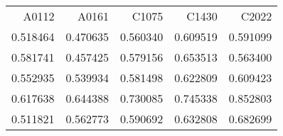 \begin{tabular}{rrrrr}
\toprule
   A0112 &    A0161 &    C1075 &    C1430 &    C2022 \\
0.518464 & 0.470635 & 0.560340 & 0.609519 & 0.591099 \\
\midrule
0.581741 & 0.457425 & 0.579156 & 0.653513 & 0.563400 \\
0.552935 & 0.539934 & 0.581498 & 0.622809 & 0.609423 \\
0.617638 & 0.644388 & 0.730085 & 0.745338 & 0.852803 \\
0.511821 & 0.562773 & 0.590692 & 0.632808 & 0.682699 \\
\bottomrule
\end{tabular}
